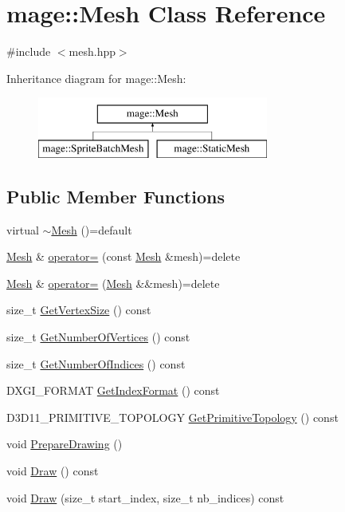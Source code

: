 \hypertarget{classmage_1_1_mesh}{}\section{mage\+:\+:Mesh Class Reference}
\label{classmage_1_1_mesh}


{\ttfamily \#include $<$mesh.\+hpp$>$}

Inheritance diagram for mage\+:\+:Mesh\+:\begin{figure}[H]
\begin{center}
\leavevmode
\includegraphics[height=2.000000cm]{classmage_1_1_mesh}
\end{center}
\end{figure}
\subsection*{Public Member Functions}
\begin{DoxyCompactItemize}
\item 
virtual \hyperlink{classmage_1_1_mesh_a53b4b9054a518c1f7e2078fdc65a95b8}{$\sim$\+Mesh} ()=default
\item 
\hyperlink{classmage_1_1_mesh}{Mesh} \& \hyperlink{classmage_1_1_mesh_a5baf961af32b379671a59a082492bc5e}{operator=} (const \hyperlink{classmage_1_1_mesh}{Mesh} \&mesh)=delete
\item 
\hyperlink{classmage_1_1_mesh}{Mesh} \& \hyperlink{classmage_1_1_mesh_a28e437196db171b2df1c4bcf3df07a63}{operator=} (\hyperlink{classmage_1_1_mesh}{Mesh} \&\&mesh)=delete
\item 
size\+\_\+t \hyperlink{classmage_1_1_mesh_a2421eac892ef5fd6db21d8214c02e774}{Get\+Vertex\+Size} () const
\item 
size\+\_\+t \hyperlink{classmage_1_1_mesh_a47732f4ac48000c2a1f5562bdba38a81}{Get\+Number\+Of\+Vertices} () const
\item 
size\+\_\+t \hyperlink{classmage_1_1_mesh_a69991b73609ebf936df5c7d2afd2b767}{Get\+Number\+Of\+Indices} () const
\item 
D\+X\+G\+I\+\_\+\+F\+O\+R\+M\+AT \hyperlink{classmage_1_1_mesh_ac76cf9345039a7170597a0e5219a71f9}{Get\+Index\+Format} () const
\item 
D3\+D11\+\_\+\+P\+R\+I\+M\+I\+T\+I\+V\+E\+\_\+\+T\+O\+P\+O\+L\+O\+GY \hyperlink{classmage_1_1_mesh_a3628c67de9562e31a8266a51776c903a}{Get\+Primitive\+Topology} () const
\item 
void \hyperlink{classmage_1_1_mesh_a4e3a8055985afc9fbfa8792d848761d6}{Prepare\+Drawing} ()
\item 
void \hyperlink{classmage_1_1_mesh_a62f7b8176f7747f2b4db7674524a146c}{Draw} () const
\item 
void \hyperlink{classmage_1_1_mesh_ae1f71bddbb1fa3b45cec55f0fe920c7d}{Draw} (size\+\_\+t start\+\_\+index, size\+\_\+t nb\+\_\+indices) const
\end{DoxyCompactItemize}
